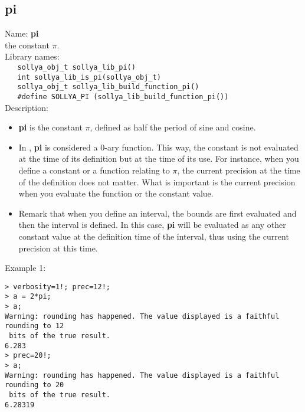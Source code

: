 \subsection{pi}
\label{labpi}
\noindent Name: \textbf{pi}\\
\phantom{aaa}the constant $\pi$.\\[0.2cm]
\noindent Library names:\\
\verb|   sollya_obj_t sollya_lib_pi()|\\
\verb|   int sollya_lib_is_pi(sollya_obj_t)|\\
\verb|   sollya_obj_t sollya_lib_build_function_pi()|\\
\verb|   #define SOLLYA_PI (sollya_lib_build_function_pi())|\\[0.2cm]
\noindent Description: \begin{itemize}

\item \textbf{pi} is the constant $\pi$, defined as half the period of sine and cosine.

\item In \sollya, \textbf{pi} is considered a 0-ary function. This way, the constant 
   is not evaluated at the time of its definition but at the time of its use. For 
   instance, when you define a constant or a function relating to $\pi$, the current
   precision at the time of the definition does not matter. What is important is 
   the current precision when you evaluate the function or the constant value.

\item Remark that when you define an interval, the bounds are first evaluated and 
   then the interval is defined. In this case, \textbf{pi} will be evaluated as any 
   other constant value at the definition time of the interval, thus using the 
   current precision at this time.
\end{itemize}
\noindent Example 1: 
\begin{center}\begin{minipage}{15cm}\begin{Verbatim}[frame=single,commandchars=\\\|\~]
> verbosity=1!; prec=12!;
> a = 2*pi;
> a;
Warning: rounding has happened. The value displayed is a faithful rounding to 12
 bits of the true result.
6.283
> prec=20!;
> a;
Warning: rounding has happened. The value displayed is a faithful rounding to 20
 bits of the true result.
6.28319
\end{Verbatim}
\end{minipage}\end{center}
